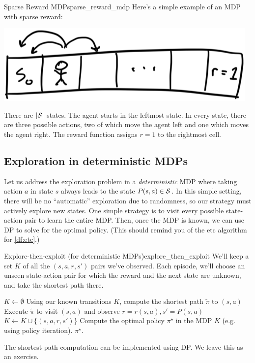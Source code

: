 \documentclass[\main/main]{subfiles}
\begin{document}
\begin{example}{Sparse Reward MDP}{sparse_reward_mdp}
    Here's a simple example of an MDP with sparse reward:

    \begin{center}
        \includegraphics{assets/sparse_reward_mdp}
    \end{center}

    There are $|\S|$ states.
    The agent starts in the leftmost state.
    In every state, there are three possible actions, two of which move the agent left and one which moves the agent right. The reward function assigns $r=1$ to the rightmost cell.
\end{example}


\subsection{Exploration in deterministic MDPs}

Let us address the exploration problem in a \emph{deterministic} MDP where taking action $a$ in state $s$ always leads to the state $P(s, a) \in \S$.
In this simple setting, there will be no ``automatic'' exploration due to randomness, so our strategy must actively explore new states.
One simple strategy is to visit every possible state-action pair to learn the entire MDP.
Then, once the MDP is known, we can use DP to solve for the optimal policy.
(This should remind you of the \acrlong{etc} algorithm for  \eqref{df:etc}.)

\begin{definition}{Explore-then-exploit (for deterministic MDPs)}{explore_then_exploit}
    We'll keep a set $K$ of all the $(s, a, r, s')$ pairs we've observed.
    Each episode, we'll choose an unseen state-action pair for which the reward and the next state are unknown, and take the shortest path there.

    \begin{algorithmic}
        \State $K \gets \emptyset$
        \State Using our known transitions $K$, compute the shortest path $\tilde \pi$ to $(s, a)$
        \State Execute $\tilde \pi$ to visit $(s, a)$ and observe $r = r(s, a), s' = P(s, a)$
        \State $K \gets K \cup \{ (s, a, r, s') \}$
        \EndWhile
        \State Compute the optimal policy $\pi^\star$ in the MDP $K$ (e.g. using policy iteration).
        \State \Return $\pi^\star$.
    \end{algorithmic}

    The shortest path computation can be implemented using DP. We leave this as an exercise.
\end{definition}
\end{document}
